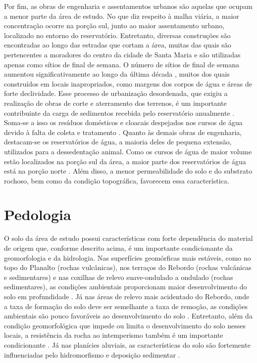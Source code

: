 Por fim, as obras de engenharia e assentamentos urbanos são aquelas que ocupam a menor parte da área de 
estudo. No que diz respeito à malha viária, a maior concentração ocorre na porção sul, junto ao maior 
assentamento urbano, localizado no entorno do reservatório. Entretanto, diversas construções são encontradas 
ao longo das estradas que cortam a área, muitas das quais são pertencentes a moradores do centro da cidade de 
Santa Maria e são utilizadas apenas como sítios de final de semana. O número de sítios de final de semana 
aumentou significativamente ao longo da última década \cite{Goldani2006}, muitos dos quais construídos em 
locais inapropriados, como margens dos corpos de água e áreas de forte declividade. Esse processo de 
urbanização desordenada, que exigiu a realização de obras de corte e aterramento dos terrenos, é um importante 
contribuinte da carga de sedimentos recebida pelo reservatório anualmente \cite{PaivaEtAl2001, DillEtAl2004, 
MiguelEtAl2014}. Soma-se a isso os resíduos domésticos e cloacais despejados nos cursos de água devido à falta 
de coleta e tratamento \cite{Goldani2006}. Quanto às demais obras de engenharia, destacam-se os reservatórios 
de água, a maioria deles de pequena extensão, utilizados para a dessedentação animal. Como os cursos de água 
de maior volume estão localizados na porção sul da área, a maior parte dos reservatórios de água está na 
porção norte \cite{SamuelRosaEtAl2011a}. Além disso, a menor permeabilidade do solo e do substrato rochoso, bem 
como da condição topográfica, favorecem essa característica.

\section{Pedologia}

O solo da área de estudo possui características com forte dependência do material de origem 
\cite{NascimentoEtAl2010} que, conforme descrito acima, é um importante condicionante da geomorfologia e da 
hidrologia. Nas superfícies geomórficas mais estáveis, como no topo do Planalto (rochas vulcânicas), nos 
terraços do Rebordo (rochas vulcânicas e sedimentares) e nas coxilhas de relevo suave-ondulado a ondulado 
(rochas sedimentares), as condições ambientais proporcionam maior desenvolvimento do solo em profundidade 
\cite{Moser1990}. Já nas áreas de relevo mais acidentado do Rebordo, onde a taxa de formação do solo deve ser 
semelhante a taxa de remoção, as condições ambientais são pouco favoráveis ao desenvolvimento do solo 
\cite{Moser1990, DalmolinEtAl2006a, Sturmer2008, SamuelRosaEtAl2011a}. Entretanto, além da condição 
geomorfológica que impede ou limita o desenvolvimento do solo nesses locais, a resistência da rocha ao 
intemperismo também é um importante condicionante \cite{Pedron2007}. Já nas planícies aluviais, as 
características do solo são fortemente influenciadas pelo hidromorfismo e deposição sedimentar 
\cite{Moser1990, Miguel2010}.

